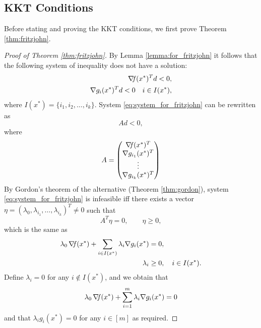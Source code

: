 \documentclass[10pt,a4paper]{article}
\begin{document}
\subsection{KKT Conditions}
Before stating and proving the KKT conditions, we first prove Theorem \ref{thm:fritzjohn}.
\begin{proof}[Proof of Theorem \ref{thm:fritzjohn}]
	By Lemma \ref{lemma:for_fritzjohn} it follows that the following system of inequality does not have a solution:
	\begin{equation}\label{eq:system_for_fritzjohn}
		\begin{split}
			\operatorname*{\mathit{\nabla \!f}}(x^*)^Td<0,\\
			\nabla g_i(x^*)^Td<0 \quad i\in I(x^*),
		\end{split}
	\end{equation}
where $I(x^*)=\{i_1, i_2, \dots, i_k\}$. System \eqref{eq:system_for_fritzjohn} can be rewritten as 
\begin{equation*}
	Ad<0,
\end{equation*}
where 
\begin{equation*}
	A=\begin{pmatrix}
		\operatorname*{\mathit{\nabla \!f}}(x^*)^T\\
		\nabla g_{i_1}(x^*)^T\\
		\vdots\\
		\nabla g_{i_k}(x^*)^T
	\end{pmatrix}
\end{equation*}
By Gordon's theorem of the alternative (Theorem \ref{thm:gordon}), system \eqref{eq:system_for_fritzjohn} is infeasible iff there exists a vector $\eta=(\lambda_0, \lambda_{i_1}, \dots, \lambda_{i_k})^T\neq 0$ such that 
\begin{equation*}
	A^T\eta = 0, \qquad \eta\geq 0,
\end{equation*}
which is the same as 
\begin{equation*}
	\begin{split}
		\lambda_0 \operatorname*{\mathit{\nabla \!f}}(x^*) + \sum_{i\in I(x^*)} \lambda_i \nabla g_i(x^*) &= 0,\\
		\lambda_i&\geq 0, \quad i \in I(x^*).
	\end{split}
\end{equation*}
Define $\lambda_i=0$ for any $i\not \in I(x^*)$, and we obtain that 
\begin{equation*}
	\lambda_0 \operatorname*{\mathit{\nabla \!f}}(x^*) + \sum_{i=1}^{m} \lambda_i\nabla g_i(x^*)=0
\end{equation*}
and that $\lambda_i g_i(x^*)=0$ for any $i\in [m]$ as required.
\end{proof}
\end{document}

